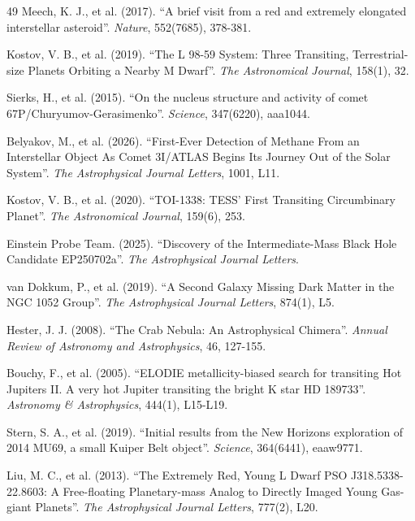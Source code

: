\documentclass[11pt, a4paper]{article}
\begin{document}
\begin{thebibliography}{49}
  Meech, K. J., et al. (2017). ``A brief visit from a red and extremely elongated interstellar asteroid''. \textit{Nature}, 552(7685), 378-381.

  Kostov, V. B., et al. (2019). ``The L 98-59 System: Three Transiting, Terrestrial-size Planets Orbiting a Nearby M Dwarf''. \textit{The Astronomical Journal}, 158(1), 32.

  Sierks, H., et al. (2015). ``On the nucleus structure and activity of comet 67P/Churyumov-Gerasimenko''. \textit{Science}, 347(6220), aaa1044.

  Belyakov, M., et al. (2026). ``First-Ever Detection of Methane From an Interstellar Object As Comet 3I/ATLAS Begins Its Journey Out of the Solar System''. \textit{The Astrophysical Journal Letters}, 1001, L11.

  Kostov, V. B., et al. (2020). ``TOI-1338: TESS' First Transiting Circumbinary Planet''. \textit{The Astronomical Journal}, 159(6), 253.

  Einstein Probe Team. (2025). ``Discovery of the Intermediate-Mass Black Hole Candidate EP250702a''. \textit{The Astrophysical Journal Letters}.

  van Dokkum, P., et al. (2019). ``A Second Galaxy Missing Dark Matter in the NGC 1052 Group''. \textit{The Astrophysical Journal Letters}, 874(1), L5.

  Hester, J. J. (2008). ``The Crab Nebula: An Astrophysical Chimera''. \textit{Annual Review of Astronomy and Astrophysics}, 46, 127-155.

  Bouchy, F., et al. (2005). ``ELODIE metallicity-biased search for transiting Hot Jupiters II. A very hot Jupiter transiting the bright K star HD 189733''. \textit{Astronomy \& Astrophysics}, 444(1), L15-L19.

  Stern, S. A., et al. (2019). ``Initial results from the New Horizons exploration of 2014 MU69, a small Kuiper Belt object''. \textit{Science}, 364(6441), eaaw9771.

  Liu, M. C., et al. (2013). ``The Extremely Red, Young L Dwarf PSO J318.5338-22.8603: A Free-floating Planetary-mass Analog to Directly Imaged Young Gas-giant Planets''. \textit{The Astrophysical Journal Letters}, 777(2), L20.


\end{thebibliography}
\end{document}
